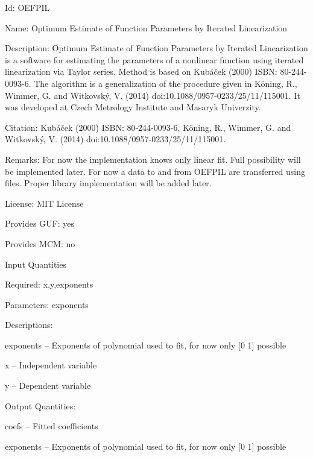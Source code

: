 \begin{tightdesc}
\item [Id:] OEFPIL
\item [Name:] Optimum Estimate of Function Parameters by Iterated Linearization
\item [Description:] Optimum Estimate of Function Parameters by Iterated Linearization is a software for estimating the parameters of a nonlinear function using iterated linearization via Taylor series. Method is based on Kubáček (2000) ISBN: 80-244-0093-6. The algorithm is a generalization of the procedure given in Köning, R., Wimmer, G. and Witkovský, V. (2014) doi:10.1088/0957-0233/25/11/115001. It was developed at Czech Metrology Institute and Masaryk Univerzity.
\item [Citation:] Kubáček (2000) ISBN: 80-244-0093-6, Köning, R., Wimmer, G. and Witkovský, V. (2014) doi:10.1088/0957-0233/25/11/115001.
\item [Remarks:] For now the implementation knows only linear fit. Full possibility will be implemented later. For now a data to and from OEFPIL are transferred using files. Proper library implementation will be added later.
\item [License:] MIT License
\item [Provides GUF:] yes
\item [Provides MCM:] no
\item [Input Quantities] \rule{0em}{0em}
    \begin{tightdesc}
    \item [Required:] 
        \textsf{x},\enspace \textsf{y},\enspace \textsf{exponents}
    \item [Parameters:] 
        \textsf{exponents}
    \item [Descriptions:] \rule{0em}{0em}
        \begin{tightdesc}
            \item[\textsf{exponents}] -- Exponents of polynomial used to fit, for now only [0 1] possible
            \item[\textsf{x}] -- Independent variable
            \item[\textsf{y}] -- Dependent variable
        \end{tightdesc}
    \end{tightdesc}
\item [Output Quantities:] \rule{0em}{0em}
    \begin{tightdesc}
        \item[\textsf{coefs}] -- Fitted coefficients
        \item[\textsf{exponents}] -- Exponents of polynomial used to fit, for now only [0 1] possible
    \end{tightdesc}
\end{tightdesc}
